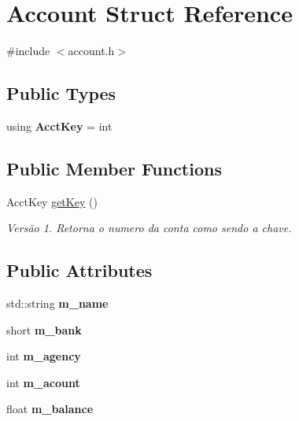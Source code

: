 \hypertarget{struct_account}{}\section{Account Struct Reference}
\label{struct_account}


{\ttfamily \#include $<$account.\+h$>$}

\subsection*{Public Types}
\begin{DoxyCompactItemize}
\item 
\mbox{\label{struct_account_abbcbb1207102189d45893a23cbc479ca}} 
using {\bfseries Acct\+Key} = int
\end{DoxyCompactItemize}
\subsection*{Public Member Functions}
\begin{DoxyCompactItemize}
\item 
\mbox{\label{struct_account_a97724a511237c1f32d0326e90a31fda5}} 
Acct\+Key \hyperlink{struct_account_a97724a511237c1f32d0326e90a31fda5}{get\+Key} ()
\begin{DoxyCompactList}\small\item\em Versão 1. Retorna o numero da conta como sendo a chave. \end{DoxyCompactList}\end{DoxyCompactItemize}
\subsection*{Public Attributes}
\begin{DoxyCompactItemize}
\item 
\mbox{\label{struct_account_af0fde72eb2a354280bfda0d1425d3e07}} 
std\+::string {\bfseries m\+\_\+name}
\item 
\mbox{\label{struct_account_a690a3938ab2ab36f714afd88cb464132}} 
short {\bfseries m\+\_\+bank}
\item 
\mbox{\label{struct_account_a2308f3a219af3d12d89c9c2b7ca950f5}} 
int {\bfseries m\+\_\+agency}
\item 
\mbox{\label{struct_account_acd0551ce37f741f7e6ca1b6647f6292b}} 
int {\bfseries m\+\_\+acount}
\item 
\mbox{\label{struct_account_ac3210bf07613a2eb83410b4f09807e68}} 
float {\bfseries m\+\_\+balance}
\end{DoxyCompactItemize}
